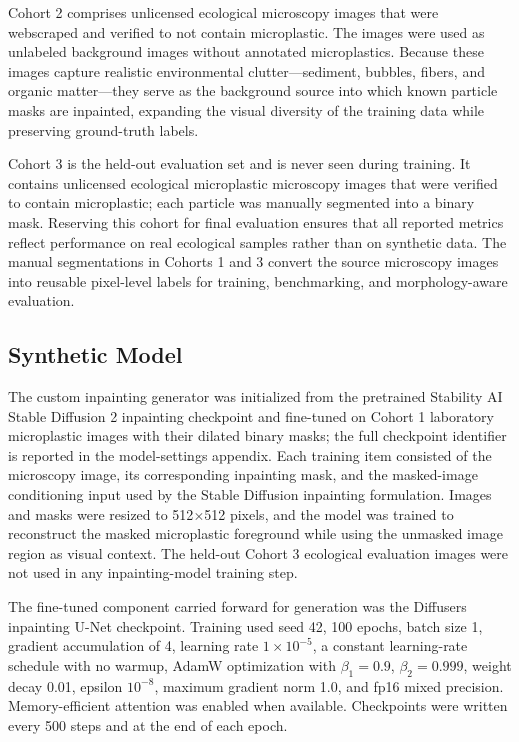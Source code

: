 \documentclass[11pt]{article}
\begin{document}
Cohort 2 comprises unlicensed ecological microscopy images that were webscraped and verified to not contain microplastic. The images were used as unlabeled background images without annotated microplastics. Because these images capture realistic environmental clutter---sediment, bubbles, fibers, and organic matter---they serve as the background source into which known particle masks are inpainted, expanding the visual diversity of the training data while preserving ground-truth labels.

Cohort 3 is the held-out evaluation set and is never seen during training. It contains unlicensed ecological microplastic microscopy images that were verified to contain microplastic; each particle was manually segmented into a binary mask. Reserving this cohort for final evaluation ensures that all reported metrics reflect performance on real ecological samples rather than on synthetic data. The manual segmentations in Cohorts 1 and 3 convert the source microscopy images into reusable pixel-level labels for training, benchmarking, and morphology-aware evaluation.

\subsection{Synthetic Model}
The custom inpainting generator was initialized from the pretrained Stability AI Stable Diffusion 2 inpainting checkpoint \cite{30} and fine-tuned on Cohort 1 laboratory microplastic images with their dilated binary masks; the full checkpoint identifier is reported in the model-settings appendix. Each training item consisted of the microscopy image, its corresponding inpainting mask, and the masked-image conditioning input used by the Stable Diffusion inpainting formulation. Images and masks were resized to 512$\times$512 pixels, and the model was trained to reconstruct the masked microplastic foreground while using the unmasked image region as visual context. The held-out Cohort 3 ecological evaluation images were not used in any inpainting-model training step.

The fine-tuned component carried forward for generation was the Diffusers inpainting U-Net checkpoint. Training used seed 42, 100 epochs, batch size 1, gradient accumulation of 4, learning rate $1\times10^{-5}$, a constant learning-rate schedule with no warmup, AdamW optimization with $\beta_1=0.9$, $\beta_2=0.999$, weight decay 0.01, epsilon $10^{-8}$, maximum gradient norm 1.0, and fp16 mixed precision. Memory-efficient attention was enabled when available. Checkpoints were written every 500 steps and at the end of each epoch.
\end{document}
